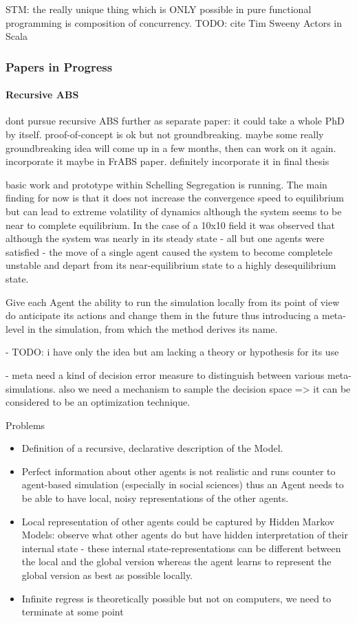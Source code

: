STM: the really unique thing which is ONLY possible in pure functional programming is composition of concurrency. TODO: cite Tim Sweeny
Actors in Scala

\subsubsection{Papers in Progress}
\paragraph{Recursive ABS}
dont pursue recursive ABS further as separate paper: it could take a whole PhD by itself. proof-of-concept is ok but not groundbreaking. maybe some really groundbreaking idea will come up in a few months, then can work on it again. incorporate it maybe in FrABS paper. definitely incorporate it in final thesis

basic work and prototype within Schelling Segregation is running. The main finding for now is that it does not increase the convergence speed to equilibrium but can lead to extreme volatility of dynamics although the system seems to be near to complete equilibrium. In the case of a 10x10 field it was observed that although the system was nearly in its steady state - all but one agents were satisfied - the move of a single agent caused the system to become completele unstable and depart from its near-equilibrium state to a highly desequilibrium state.

Give each  Agent the ability to run the simulation locally from its point of view do anticipate its actions and change them in the future thus introducing a meta-level in the simulation, from which the method derives its name.

- TODO:  i have only the idea but am lacking a theory or hypothesis for its use

- meta need a kind of decision error measure to distinguish between various meta-simulations. also we need a mechanism to sample the decision space => it can be considered to be an optimization technique.

Problems
\begin{itemize}
	\item Definition of a recursive, declarative description of the Model.
	\item Perfect information about other agents is not realistic and runs counter to agent-based simulation (especially in social sciences) thus an Agent needs to be able to have local, noisy representations of the other agents.
	\item Local representation of other agents could be captured by Hidden Markov Models: observe what other agents do but have hidden interpretation of their internal state - these internal state-representations can be different between the local and the global version whereas the agent learns to represent the global version as best as possible locally.
	\item Infinite regress is theoretically possible but not on computers, we need to terminate at some point
\end{itemize}


